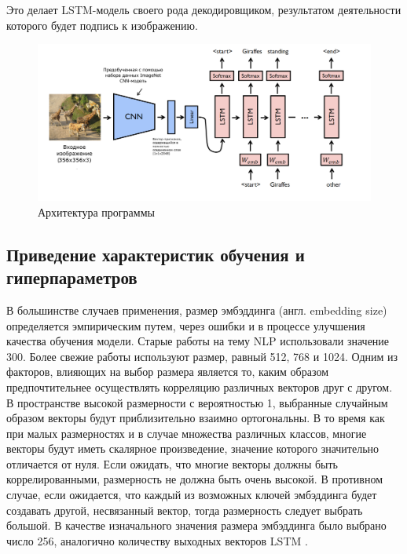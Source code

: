 \documentclass[bachelor, och, coursework]{SCWorks}
\begin{document}
        Это делает LSTM-модель своего рода декодировщиком, результатом
        деятельности которого будет подпись к изображению.

        \begin{figure}[H]
            \centering
            \includegraphics[width=1\textwidth]{pics/arch.png}
            \caption{Архитектура программы \cite{architecture}}
        \end{figure}

    \subsection{Приведение характеристик обучения и гиперпараметров}

        В большинстве случаев применения, размер эмбэддинга (англ. embedding
        size) определяется эмпирическим путем, через ошибки и в процессе
        улучшения качества обучения модели. Старые работы на тему NLP
        использовали значение 300. Более свежие работы используют размер, равный
        512, 768 и 1024. Одним из факторов, влияющих на выбор размера является
        то, каким образом предпочтительнее осуществлять корреляцию различных
        векторов друг с другом. В пространстве высокой размерности с
        вероятностью 1, выбранные случайным образом векторы будут приблизительно
        взаимно ортогональны. В то время как при малых размерностях и в случае
        множества различных классов, многие векторы будут иметь скалярное
        произведение, значение которого значительно отличается от нуля. Если
        ожидать, что многие векторы должны быть коррелированными, размерность не
        должна быть очень высокой. В противном случае, если ожидается, что
        каждый из возможных ключей эмбэддинга будет создавать другой,
        несвязанный вектор, тогда размерность следует выбрать большой. В
        качестве изначального значения размера эмбэддинга было выбрано число
        256, аналогично количеству выходных векторов LSTM \cite{embedding}.
        
\end{document}
